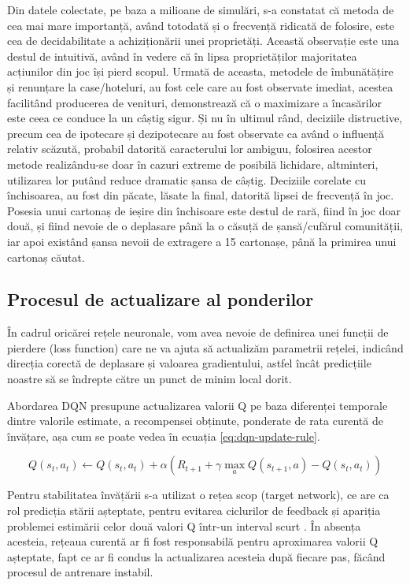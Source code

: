 Din datele colectate, pe baza a milioane de simulări, s-a constatat că metoda de cea mai mare importanță, având totodată și o frecvență ridicată de folosire, este cea de decidabilitate a achiziționării unei proprietăți. Această observație este una destul de intuitivă, având în vedere că în lipsa proprietăților majoritatea acțiunilor din joc își pierd scopul. Urmată de aceasta, metodele de îmbunătățire și renunțare la case/hoteluri, au fost cele care au fost observate imediat, acestea facilitând producerea de venituri, demonstrează că o maximizare a încasărilor este ceea ce conduce la un câștig sigur. Și nu în ultimul rând, deciziile distructive, precum cea de ipotecare și dezipotecare au fost observate ca având o influență relativ scăzută, probabil datorită caracterului lor ambiguu, folosirea acestor metode realizându-se doar în cazuri extreme de posibilă lichidare, altminteri, utilizarea lor putând reduce dramatic șansa de câștig. Deciziile corelate cu închisoarea, au fost din păcate, lăsate la final, datorită lipsei de frecvență în joc. Posesia unui cartonaș de ieșire din închisoare este destul de rară, fiind în joc doar două, și fiind nevoie de o deplasare până la o căsuță de șansă/cufărul comunității, iar apoi existând șansa nevoii de extragere a 15 cartonașe, până la primirea unui cartonaș căutat.

\subsection{Procesul de actualizare al ponderilor}
În cadrul oricărei rețele neuronale, vom avea nevoie de definirea unei funcții de pierdere (loss function) care ne va ajuta să actualizăm parametrii rețelei, indicând direcția corectă de deplasare și valoarea gradientului, astfel încât predicțiile noastre să se îndrepte către un punct de minim local dorit.

Abordarea DQN presupune actualizarea valorii Q pe baza diferenței temporale dintre valorile estimate, a recompensei obținute, ponderate de rata curentă de învățare, așa cum se poate vedea în ecuația \ref{eq:dqn-update-rule}.

\begin{equation}\label{eq:dqn-update-rule}
    Q(s_t, a_t) \leftarrow Q(s_t, a_t) + \alpha(R_{t+1} + \gamma \max_a Q(s_{t+1}, a) - Q(s_t, a_t))
\end{equation}

Pentru stabilitatea învățării s-a utilizat o rețea scop (target network), ce are ca rol predicția stării așteptate, pentru evitarea ciclurilor de feedback și apariția problemei estimării celor două valori Q într-un interval scurt \cite{milvus_target_networks}. În absența acesteia, rețeaua curentă ar fi fost responsabilă pentru aproximarea valorii Q așteptate, fapt ce ar fi condus la actualizarea acesteia după fiecare pas, făcând procesul de antrenare instabil.

